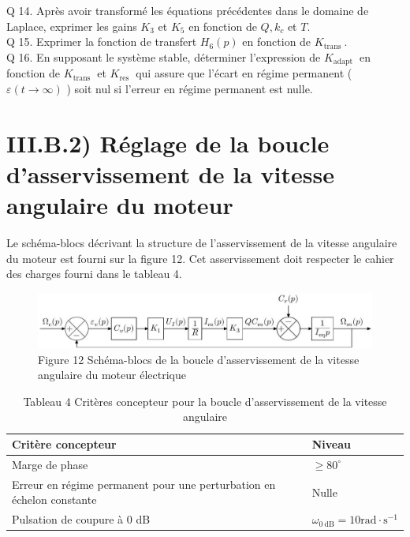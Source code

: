 \documentclass[10pt]{article}
\begin{document}
Q 14. Après avoir transformé les équations précédentes dans le domaine de Laplace, exprimer les gains $K_{3}$ et $K_{5}$ en fonction de $Q, k_{c}$ et $T$.\\
Q 15. Exprimer la fonction de transfert $H_{6}(p)$ en fonction de $K_{\text {trans }}$.\\
Q 16. En supposant le système stable, déterminer l'expression de $K_{\text {adapt }}$ en fonction de $K_{\text {trans }}$ et $K_{\text {res }}$ qui assure que l'écart en régime permanent ( $\varepsilon(t \rightarrow \infty)$ ) soit nul si l'erreur en régime permanent est nulle.

\section{III.B.2) Réglage de la boucle d'asservissement de la vitesse angulaire du moteur}
Le schéma-blocs décrivant la structure de l'asservissement de la vitesse angulaire du moteur est fourni sur la figure 12. Cet asservissement doit respecter le cahier des charges fourni dans le tableau 4.

\begin{figure}[h]
\begin{center}
  \includegraphics[width=\textwidth]{2025_09_16_5f2d7643f7e649c6833dg-10}
\captionsetup{labelformat=empty}
\caption{Figure 12 Schéma-blocs de la boucle d'asservissement de la vitesse angulaire du moteur électrique}
\end{center}
\end{figure}

\begin{table}[h]
\begin{center}
\begin{tabular}{|l|l|}
\hline
Critère concepteur & Niveau \\
\hline
Marge de phase & $\geqslant 80^{\circ}$ \\
\hline
Erreur en régime permanent pour une perturbation en échelon constante & Nulle \\
\hline
Pulsation de coupure à 0 dB & $\omega_{0 \mathrm{~dB}}=10 \mathrm{rad} \cdot \mathrm{s}^{-1}$ \\
\hline
\end{tabular}
\captionsetup{labelformat=empty}
\caption{Tableau 4 Critères concepteur pour la boucle d'asservissement de la vitesse angulaire}
\end{center}
\end{table}
\end{document}
